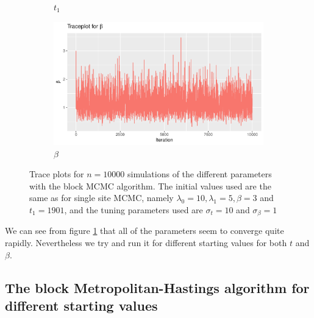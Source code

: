 \begin{figure}[H]
\begin{subfigure}[b]{0.45\textwidth}
        \caption{$t_1$}
    \end{subfigure}
    \begin{subfigure}[b]{0.45\textwidth}
        \centering
        \includegraphics[width = \textwidth]{Images/block_sim_beta_sigma1.pdf}
        \caption{$\beta$}
    \end{subfigure}
    \caption{Trace plots for $n = 10000$ simulations of the different parameters with the block MCMC algorithm. The initial values used are the same as for single site MCMC, namely $\lambda_0 = 10, \lambda_1 = 5, \beta = 3$ and $t_1 = 1901$, and the tuning parameters used are $\sigma_t = 10$ and $\sigma_{\beta} = 1$}
    \label{fig:burnin_blockMH}
\end{figure}

We can see from figure \ref{fig:burnin_blockMH} that all of the parameters seem to converge quite rapidly. 
Nevertheless we try and run it for different starting values for both $t$ and $\beta$.

\subsection{The block Metropolitan-Hastings algorithm for different starting values}

